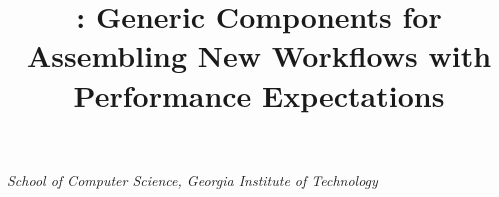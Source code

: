 \title{\sys: Generic Components for Assembling New Workflows with Performance Expectations}

\ifdefined\DRAFT
 \pagestyle{fancyplain}
 \rhead{\thedate}
\fi




    {\emph{School of Computer Science, Georgia Institute of Technology}}{}
